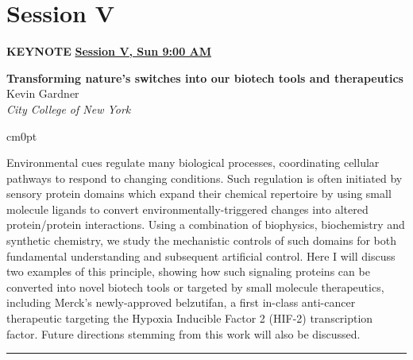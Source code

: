 \documentclass[titlepage,oneside,openany,10pt]{book}
\newenvironment{oralabswfigkeynote}[6]
        {
	\FPeval{\cutw}{clip(16.7-#5)}
	\FPeval{\cutl}{round(#6/0.35,3)}
        \noindent\textbf{#1}\\%
        #2\\%
        \textit{#3}\\ %
        \def\windowpagestuff{\flushright
                \texttt{[image: \#4]}}
        \opencutright
        \begin{cutout}{0}{\cutw cm}{0pt}{\RoundingUpFunction{\cutl}}
        \noindent
        }
        {
        \end{cutout}
        \noindent\rule{15cm}{0.5pt}%
        }
\begin{document}
\newpage

\section*{Session V}
\label{sec:sessV}

\vspace{0.5cm}

\begin{shaded}
\noindent\textbf{KEYNOTE} \hfill \textbf{\underline{Session V, Sun 9:00 AM}}

\begin{oralabswfigkeynote}
	{Transforming nature's switches into our biotech tools and therapeutics}
	{Kevin Gardner}
	{City College of New York}
	{abstract_figures/Gardner_Kevin.png}
	{10.0}
	{5.0}
	Environmental cues regulate many biological processes, coordinating cellular pathways 
	to respond to changing conditions.  Such regulation is often initiated by sensory protein 
	domains which expand their chemical repertoire by using small molecule ligands to 
	convert environmentally-triggered changes into altered protein/protein interactions.  
	Using a combination of biophysics, biochemistry and synthetic chemistry, we study the 
	mechanistic controls of such domains for both fundamental understanding and 
	subsequent artificial control.  Here I will discuss two examples of this principle, showing 
	how such signaling proteins can be converted into novel biotech tools or targeted by 
	small molecule therapeutics, including Merck's newly-approved belzutifan, a first in-class
	anti-cancer therapeutic targeting the Hypoxia Inducible Factor 2 (HIF-2) transcription 
	factor.  Future directions stemming from this work will also be discussed.
	\label{GardnerK}
\end{oralabswfigkeynote}
\end{shaded}

\vspace{1cm}
\end{document}
